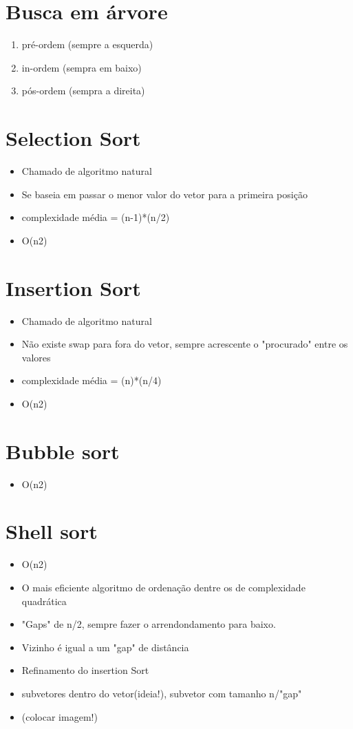 \documentclass{article}
\begin{document}
\section{Busca em árvore}
	\begin{enumerate}
	\item pré-ordem (sempre a esquerda)
	\item in-ordem (sempra em baixo)
	\item pós-ordem (sempra a direita)
	\end{enumerate}

\section{Selection Sort}
	\begin{itemize}
	\item Chamado de algoritmo natural
	\item Se baseia em passar o menor valor do vetor para a primeira posição
	\item complexidade média = (n-1)*(n/2)
	\item O(n2)	
	\end{itemize}
\section{Insertion Sort}
	\begin{itemize}
	\item Chamado de algoritmo natural
	\item Não existe swap para fora do vetor, sempre acrescente o "procurado" entre os valores
	\item complexidade média = (n)*(n/4)
	\item O(n2)
	\end{itemize}
\section{Bubble sort}
	\begin{itemize}
	\item O(n2)
	\end{itemize}
	
\section{Shell sort}

	\begin{itemize}
	\item O(n2)	
	\item O mais eficiente algoritmo de ordenação dentre os de complexidade quadrática
	\item "Gaps" de n/2, sempre fazer o arrendondamento para baixo.
	\item Vizinho é igual a um "gap" de distância
	\item Refinamento do insertion Sort
	\item subvetores dentro do vetor(ideia!), subvetor com tamanho n/"gap"
	\item (colocar imagem!)
	\end{itemize}
\end{document}
